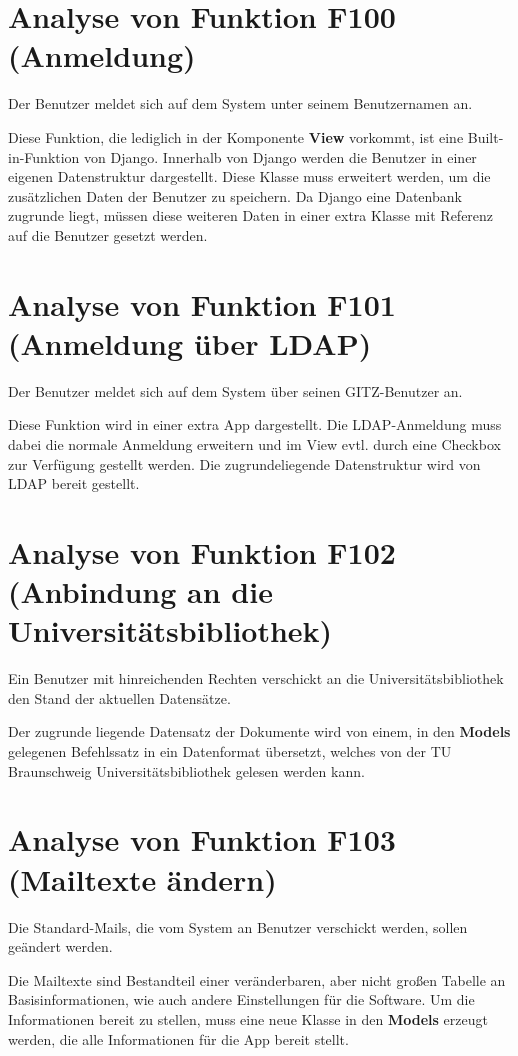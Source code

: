 \section{Analyse von Funktion F100 (Anmeldung)}
Der Benutzer meldet sich auf dem System unter seinem Benutzernamen an.

Diese Funktion, die lediglich in der Komponente \textbf{View} vorkommt, ist
eine Built-in-Funktion von Django. Innerhalb von Django werden die Benutzer
in einer eigenen Datenstruktur  dargestellt. Diese Klasse muss erweitert werden,
um die zusätzlichen Daten der Benutzer zu speichern. Da Django eine Datenbank
zugrunde liegt, müssen diese weiteren Daten in einer extra Klasse mit Referenz
auf die Benutzer gesetzt werden.

\section{Analyse von Funktion F101 (Anmeldung über LDAP)}
Der Benutzer meldet sich auf dem System über seinen \Gls{GITZ}-Benutzer an.

Diese Funktion wird in einer extra App dargestellt. Die \gls{LDAP}-Anmeldung muss
dabei die normale Anmeldung erweitern und im View evtl. durch eine Checkbox zur
Verfügung gestellt werden. Die zugrundeliegende Datenstruktur wird von \gls{LDAP}
bereit gestellt.

\section{Analyse von Funktion F102 (Anbindung an die Universitätsbibliothek)}
Ein Benutzer mit hinreichenden Rechten verschickt an die Universitätsbibliothek
den Stand der aktuellen Datensätze.

Der zugrunde liegende Datensatz der Dokumente wird von einem, in den
\textbf{Models} gelegenen Befehlssatz in ein Datenformat übersetzt, welches von
der TU Braunschweig Universitätsbibliothek gelesen werden kann. 

\section{Analyse von Funktion F103 (Mailtexte ändern)}
Die Standard-Mails, die vom System an Benutzer verschickt werden, sollen geändert
werden.

Die Mailtexte sind Bestandteil einer veränderbaren, aber nicht großen Tabelle an
Basisinformationen, wie auch andere Einstellungen für die Software. Um die
Informationen bereit zu stellen, muss eine neue Klasse in den \textbf{Models}
erzeugt werden, die alle Informationen für die App bereit stellt.

